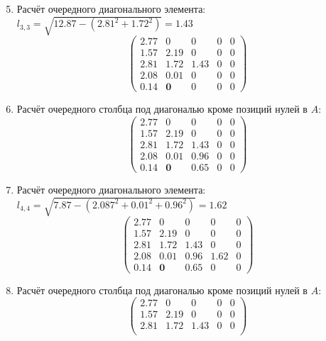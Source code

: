 \begin{multicols}{3}
    \columnbreak
    \begin{enumerate}
    \setcounter{enumi}{4}
    \item Расчёт очередного диагонального элемента: $l_{3,3} = \sqrt{12.87 - (2.81^2+1.72^2)} = 1.43$
    $$\begin{pmatrix}
        2.77 & 0          & 0    & 0 & 0 \\
        1.57 & 2.19       & 0    & 0 & 0 \\
        2.81 & 1.72       & 1.43 & 0 & 0 \\
        2.08 & 0.01       & 0    & 0 & 0 \\
        0.14 & \mathbf{0} & 0    & 0 & 0
    \end{pmatrix}$$
    \vspace{-0.5cm}
    \item Расчёт очередного столбца под диагональю кроме позиций нулей в $A$:
    $$\begin{pmatrix}
        2.77 & 0          & 0    & 0 & 0 \\
        1.57 & 2.19       & 0    & 0 & 0 \\
        2.81 & 1.72       & 1.43 & 0 & 0 \\
        2.08 & 0.01       & 0.96 & 0 & 0 \\
        0.14 & \mathbf{0} & 0.65 & 0 & 0
    \end{pmatrix}$$
    \vspace{-0.5cm}
    \item Расчёт очередного диагонального элемента: $l_{4,4} = \sqrt{7.87 - (2.087^2+0.01^2+0.96^2)} = 1.62$
    $$\begin{pmatrix}
        2.77 & 0          & 0    & 0    & 0 \\
        1.57 & 2.19       & 0    & 0    & 0 \\
        2.81 & 1.72       & 1.43 & 0    & 0 \\
        2.08 & 0.01       & 0.96 & 1.62 & 0 \\
        0.14 & \mathbf{0} & 0.65 & 0    & 0
    \end{pmatrix}$$
    \vspace{-0.5cm}
    \item Расчёт очередного столбца под диагональю кроме позиций нулей в $A$:
    $$\begin{pmatrix}
        2.77 & 0          & 0    & 0    & 0 \\
        1.57 & 2.19       & 0    & 0    & 0 \\
        2.81 & 1.72       & 1.43 & 0    & 0 \\

\end{pmatrix}$$
\end{enumerate}
\end{multicols}
